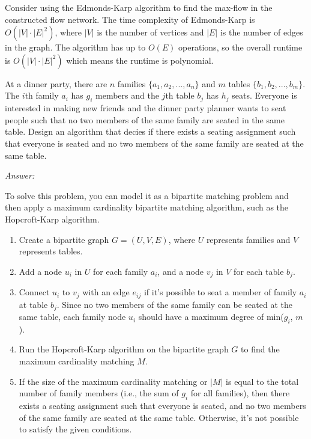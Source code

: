 \documentclass[12pt]{article}
\newenvironment{problem}[2][Problem]{\begin{trivlist}
\item[\hskip \labelsep {\bfseries #1}\hskip \labelsep {\bfseries #2.}]}{\end{trivlist}}
\begin{document}
Consider using the Edmonds-Karp algorithm to find the max-flow in the constructed flow network. The time complexity of Edmonds-Karp is $O(|V| \cdot |E|^2)$, where $|V|$ is the number of vertices and $|E|$ is the number of edges in the graph. The algorithm has up to $O(E)$ operations, so the overall runtime is $O(|V| \cdot |E|^2)$ which means the runtime is polynomial.

\begin{problem}{3}
    At a dinner party, there are $n$ families $\{a_1, a_2, ..., a_n\}$ and $m$ tables $\{b_1,b_2,...,b_m\}$. The $i$th family $a_i$ has $g_i$ members and the $j$th table $b_j$ has $h_j$ seats. Everyone is interested in making new friends and the dinner party planner wants to seat people such that no two members of the same family are seated in the same table. Design an algorithm that decies if there exists a seating assignment such that everyone is seated and no two members of the same family are seated at the same table.
\end{problem}

\textit{Answer: }

To solve this problem, you can model it as a bipartite matching problem and then apply a maximum cardinality bipartite matching algorithm, such as the Hopcroft-Karp algorithm.

\begin{enumerate}[1.]
    \item Create a bipartite graph $G = (U, V, E)$, where $U$ represents families and $V$ represents tables.
    \item Add a node $u_i$ in $U$ for each family $a_i$, and a node $v_j$ in $V$ for each table $b_j$.
    \item Connect $u_i$ to $v_j$ with an edge $e_{ij}$ if it's possible to seat a member of family $a_i$ at table $b_j$. Since no two members of the same family can be seated at the same table, each family node $u_i$ should have a maximum degree of min($g_i$, $m$).
    \item Run the Hopcroft-Karp algorithm on the bipartite graph $G$ to find the maximum cardinality matching $M$.
    \item If the size of the maximum cardinality matching or $|M|$ is equal to the total number of family members (i.e., the sum of $g_i$ for all families), then there exists a seating assignment such that everyone is seated, and no two members of the same family are seated at the same table. Otherwise, it's not possible to satisfy the given conditions.
\end{enumerate}
\end{document}
